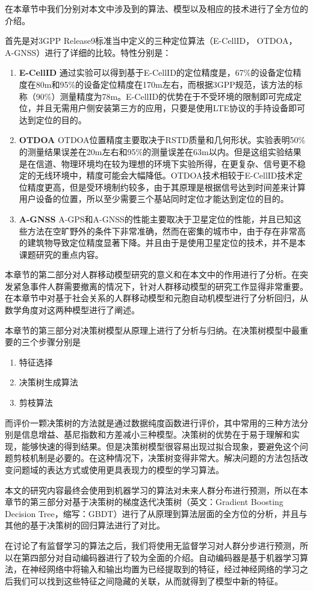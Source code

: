 在本章节中我们分别对本文中涉及到的算法、模型以及相应的技术进行了全方位的介绍。

首先是对3GPP Release9标准当中定义的三种定位算法（E-CellID， OTDOA， A-GNSS）进行了详细的比较。特性分别是：

\begin{enumerate}
    \item \textbf{E-CellID} 通过实验可以得到基于E-CellID的定位精度是，67\%的设备定位精度在80m和95\%的设备定位精度在170m左右，而根据3GPP规范，该方法的标称（90\%）测量精度为78m。E-CellID的优势在于不受环境的限制即可完成定位，并且无需用户侧安装第三方的应用，只要是使用LTE协议的手持设备即可达到定位的目的。
    \item \textbf{OTDOA} OTDOA位置精度主要取决于RSTD质量和几何形状。实验表明50\%的测量结果误差在20m左右和95\%的测量误差在63m以内。但是这组实验结果是在信道、物理环境均在较为理想的环境下实验所得，在更复杂、信号更不稳定的无线环境中，精度可能会大幅降低。OTDOA技术相较于E-CellID技术定位精度更高，但是受环境制约较多，由于其原理是根据信号达到时间差来计算用户设备的位置，所以至少需要三个基站同时定位才能达到定位的目的。
    \item \textbf{A-GNSS} A-GPS和A-GNSS的性能主要取决于卫星定位的性能，并且已知这些方法在空旷野外的条件下非常准确，然而在密集的城市中，由于存在非常高的建筑物导致定位精度显著下降。并且由于是使用卫星定位的技术，并不是本课题研究的重点内容。
\end{enumerate}

本章节的第二部分对人群移动模型研究的意义和在本文中的作用进行了分析。在突发紧急事件人群需要撤离的情况下，针对人群移动模型的研究工作显得非常重要。在本章节中对基于社会关系的人群移动模型和元胞自动机模型进行了分析回归，从数学角度对这两种模型进行了阐述。

本章节的第三部分对决策树模型从原理上进行了分析与归纳。在决策树模型中最重要的三个步骤分别是

\begin{enumerate}
    \item 特征选择
    \item 决策树生成算法
    \item 剪枝算法
\end{enumerate}
而评价一颗决策树的方法就是通过数据纯度函数进行评价，其中常用的三种方法分别是信息增益、基尼指数和方差减小三种模型。决策树的优势在于易于理解和实现，能够快速的得到结果。但是决策树模型很容易出现过拟合现象，要避免这个问题剪枝机制是必要的。在这种情况下，决策树变得非常大。解决问题的方法包括改变问题域的表达方式或使用更具表现力的模型的学习算法。

本文的研究内容最终会使用到机器学习的算法对未来人群分布进行预测，所以在本章节的第三部分对基于决策树的梯度迭代决策树（英文：Gradient Boosting Decision Tree，缩写：GBDT）进行了从原理到算法层面的全方位的分析，并且与其他的基于决策树的回归算法进行了对比。

在讨论了有监督学习的算法之后，我们将使用无监督学习对人群分步进行预测，所以在第四部分对自动编码器进行了较为全面的介绍。自动编码器是基于机器学习算法，在神经网络中将输入和输出均置为已经提取到的特征，经过神经网络的学习之后我们可以找到这些特征之间隐藏的关联，从而就得到了模型中新的特征。
